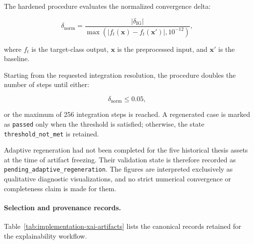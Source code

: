 The hardened procedure evaluates the normalized convergence delta:

\begin{equation}
\delta_{\mathrm{norm}}
=
\frac{
\left|\delta_{\mathrm{IG}}\right|
}{
\max\left(
\left|
f_t(\mathbf{x})-f_t(\mathbf{x}')
\right|,
10^{-12}
\right)
},
\end{equation}

where \(f_t\) is the target-class output, \(\mathbf{x}\) is the preprocessed
input, and \(\mathbf{x}'\) is the baseline.

Starting from the requested integration resolution, the procedure doubles the
number of steps until either:

\[
\delta_{\mathrm{norm}}
\leq
0.05,
\]

or the maximum of 256 integration steps is reached. A regenerated case is
marked as \texttt{passed} only when the threshold is satisfied; otherwise, the
state \texttt{threshold\_not\_met} is retained.

Adaptive regeneration had not been completed for the five historical thesis
assets at the time of artifact freezing. Their validation state is therefore
recorded as \texttt{pending\_adaptive\_regeneration}. The figures are
interpreted exclusively as qualitative diagnostic visualizations, and no
strict numerical convergence or completeness claim is made for them.

\paragraph{Selection and provenance records.}

Table~\ref{tab:implementation-xai-artifacts} lists the canonical records
retained for the explainability workflow.


